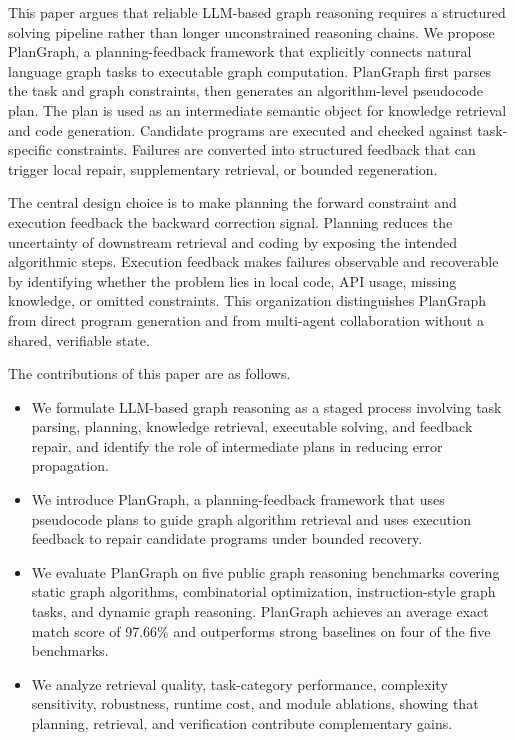 \documentclass[pdflatex,iicol,sn-mathphys-num]{sn-jnl}
\theoremstyle{thmstyleone}
\theoremstyle{thmstyletwo}
\theoremstyle{thmstylethree}
\begin{document}
This paper argues that reliable LLM-based graph reasoning requires a structured solving pipeline rather than longer unconstrained reasoning chains. We propose PlanGraph, a planning-feedback framework that explicitly connects natural language graph tasks to executable graph computation. PlanGraph first parses the task and graph constraints, then generates an algorithm-level pseudocode plan. The plan is used as an intermediate semantic object for knowledge retrieval and code generation. Candidate programs are executed and checked against task-specific constraints. Failures are converted into structured feedback that can trigger local repair, supplementary retrieval, or bounded regeneration.

The central design choice is to make planning the forward constraint and execution feedback the backward correction signal. Planning reduces the uncertainty of downstream retrieval and coding by exposing the intended algorithmic steps. Execution feedback makes failures observable and recoverable by identifying whether the problem lies in local code, API usage, missing knowledge, or omitted constraints. This organization distinguishes PlanGraph from direct program generation and from multi-agent collaboration without a shared, verifiable state.

The contributions of this paper are as follows.
\begin{itemize}
\item We formulate LLM-based graph reasoning as a staged process involving task parsing, planning, knowledge retrieval, executable solving, and feedback repair, and identify the role of intermediate plans in reducing error propagation.
\item We introduce PlanGraph, a planning-feedback framework that uses pseudocode plans to guide graph algorithm retrieval and uses execution feedback to repair candidate programs under bounded recovery.
\item We evaluate PlanGraph on five public graph reasoning benchmarks covering static graph algorithms, combinatorial optimization, instruction-style graph tasks, and dynamic graph reasoning. PlanGraph achieves an average exact match score of 97.66\% and outperforms strong baselines on four of the five benchmarks.
\item We analyze retrieval quality, task-category performance, complexity sensitivity, robustness, runtime cost, and module ablations, showing that planning, retrieval, and verification contribute complementary gains.
\end{itemize}
\end{document}
